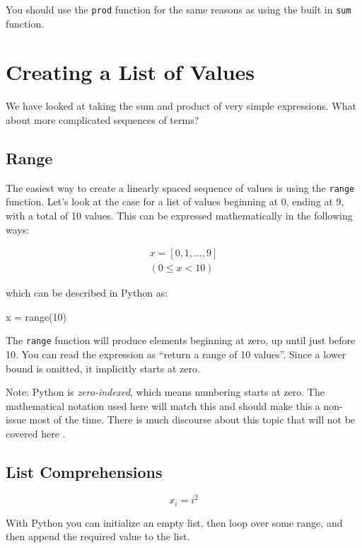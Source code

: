 \documentclass{../../KDHnotes}
\begin{document}
You should use the \texttt{prod} function for the same reasons as using the built in \texttt{sum} function.


\section{Creating a List of Values}

We have looked at taking the sum and product of very simple expressions. What about more complicated sequences of terms?


\subsection{Range}

The easiest way to create a linearly spaced sequence of values is using the \texttt{range} function.
Let's look at the case for a list of values beginning at 0, ending at 9, with a total of 10 values. This can be expressed mathematically in the following ways:

\begin{align}
x = [ 0, 1, \dots, 9 ] \\
(0 \leq x < 10)
\end{align}

which can be described in Python as:

\begin{python}
x = range(10)
\end{python}

The \texttt{range} function will produce elements beginning at zero, up until just before 10. You can read the expression as ``return a range of 10 values''. Since a lower bound is omitted, it implicitly starts at zero.

Note: Python is \textit{zero-indexed}, which means numbering starts at zero. The mathematical notation used here will match this and should make this a non-issue most of the time. There is much discourse about this topic that will not be covered here \cite{zeroindexing}.



\subsection{List Comprehensions}

\begin{equation}
	x_i = i^2
\end{equation}


With Python you can initialize an empty list, then loop over some range, and then append the required value to the list.
\end{document}
